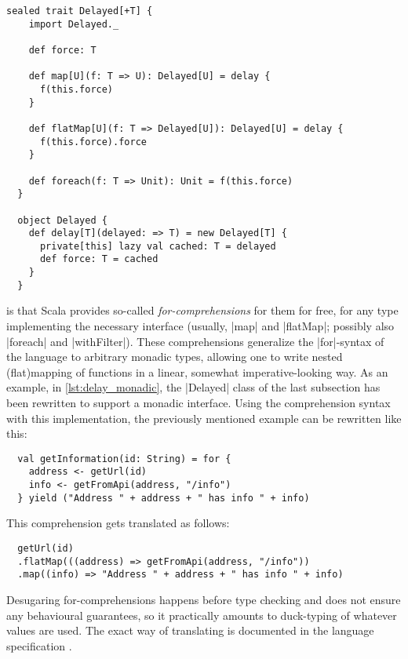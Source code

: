 \begin{lstlisting}[style=floating,
  caption={Full example of the \lstinline|Delayed| implementation, with monadic
    functions. Additionally, the \lstinline|Delayed| class was replaced by a trait, of which
    anonymous instances are created by the factory \lstinline|delay|.
    \hfill\github{dsl-examples/blob/master/src/main/scala/dsl_examples/delay/Delay3.scala}},
  label=lst:delay_monadic]
  sealed trait Delayed[+T] {
    import Delayed._

    def force: T

    def map[U](f: T => U): Delayed[U] = delay {
      f(this.force)
    }

    def flatMap[U](f: T => Delayed[U]): Delayed[U] = delay {
      f(this.force).force
    }
    
    def foreach(f: T => Unit): Unit = f(this.force)
  }

  object Delayed {
    def delay[T](delayed: => T) = new Delayed[T] {
      private[this] lazy val cached: T = delayed
      def force: T = cached
    }
  }
\end{lstlisting}

 is that Scala provides so-called \emph{for-comprehensions}
for them for free, for any type implementing the necessary interface (usually, |map| and |flatMap|;
possibly also |foreach| and |withFilter|). These comprehensions generalize the |for|-syntax of the
language to arbitrary monadic types, allowing one to write nested (flat)mapping of functions in a
linear, somewhat imperative-looking way. As an example, in \autoref{lst:delay_monadic}, the
|Delayed| class of the last subsection has been rewritten to support a monadic interface. Using the
comprehension syntax with this implementation, the previously mentioned example can be rewritten
like this:
\begin{lstlisting}
  val getInformation(id: String) = for {
    address <- getUrl(id)
    info <- getFromApi(address, "/info")
  } yield ("Address " + address + " has info " + info)
\end{lstlisting}
This comprehension gets translated as follows:
\begin{lstlisting}
  getUrl(id)
  .flatMap(((address) => getFromApi(address, "/info"))
  .map((info) => "Address " + address + " has info " + info)
\end{lstlisting}
Desugaring for-comprehensions happens before type checking and does not ensure any behavioural
guarantees, so it practically amounts to duck-typing of whatever values are used. The exact way of
translating is documented in the language specification
\cite[][Chapter~6.19]{odersky2014:scala_spec}.

